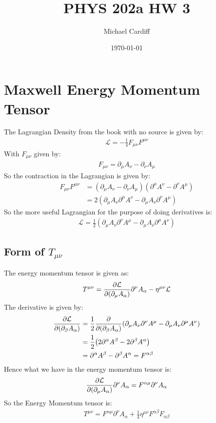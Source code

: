 \documentclass[12pt]{article}
\title{\vspace{-3em}PHYS 202a HW 3}
\author{Michael Cardiff}
\date{\today}
\renewcommand{\L}{\mathcal{L}}
\newcommand{\D}{\partial}
\begin{document}
\maketitle

\section{Maxwell Energy Momentum Tensor}
The Lagrangian Density from the book with no source is given by:
\begin{align*}
  \L=-\frac14F_{\mu\nu}F^{\mu\nu}
\end{align*}
With $F_{\mu\nu}$ given by:
\begin{align*}
  F_{\mu\nu}=\D_\mu A_\nu-\D_\nu A_\mu
\end{align*}
So the contraction in the Lagrangian is given by:
\begin{align*}
  F_{\mu\nu}F^{\mu\nu}&=(\D_\mu A_\nu-\D_\nu A_\mu)(\D^\mu A^\nu-\D^\nu A^\mu)\\
  &=2(\D_\mu A_\nu\D^\mu A^\nu-\D_\mu A_\nu\D^\nu A^\mu)
\end{align*}
So the more useful Lagrangian for the purpose of doing derivatives is:
\begin{align*}
  \L=\frac12(\D_\mu A_\nu\D^\nu A^\mu-\D_\mu A_\nu\D^\mu A^\nu)
\end{align*}

\subsection{Form of $T_{\mu\nu}$}
The energy momentum tensor is given as:
\begin{align*}
  T^{\mu\nu}=\pdv{\L}{(\D_\mu A_\alpha)}\D^\nu A_\alpha-\eta^{\mu\nu}\L
\end{align*}
The derivative is given by:
\begin{align*}
  \pdv{\L}{(\D_\beta A_\alpha)}&=\frac12
  \pdv{(\D_\beta A_\alpha)}(\D_\mu A_\nu\D^\nu A^\mu-\D_\mu A_\nu\D^\mu A^\nu)\\
  &=\frac12\qty(2\D^\alpha A^\beta-2\D^\beta A^\alpha)\\
  &=\D^\alpha A^\beta-\D^\beta A^\alpha=F^{\alpha\beta}
\end{align*}
Hence what we have in the energy momentum tensor is:
\begin{align*}
  \pdv{\L}{(\D_\mu A_\alpha)}\D^\nu A_\alpha=F^{\alpha\mu}\D^\nu A_\alpha
\end{align*}
So the Energy Momentum tensor is:
\begin{align}
  \boxed{T^{\mu\nu}=F^{\alpha\mu}\D^\nu A_\alpha
    +\frac14\eta^{\mu\nu}F^{\alpha\beta}F_{\alpha\beta}}
\end{align}
\end{document}
